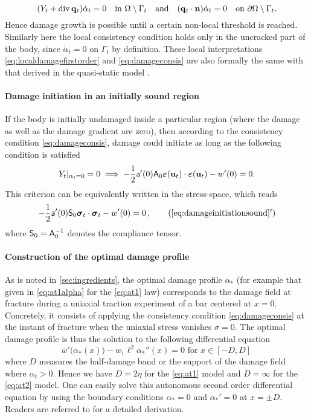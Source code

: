 \begin{equation} \label{eq:damageconsis}
(Y_t+\div\vec{q}_t)\dot{\alpha}_t=0\quad\text{in }\domaint\quad\text{and}\quad(\vec{q}_t\cdot\vec{n})\dot{\alpha}_t=0\quad\text{on }\partial\Omega\setminus\Gamma_t.
\end{equation}
Hence damage growth is possible until a certain non-local threshold is reached. Similarly here the local consistency condition holds only in the uncracked part of the body, since $\dot{\alpha}_t=0$ on $\Gamma_t$ by definition. These local interpretations \eqref{eq:localdamagefirstorder} and \eqref{eq:damageconsis} are also formally the same with that derived in the quasi-static model \cite{PhamMarigo:2010-1,SicsicMarigo:2013}.

\paragraph{Damage initiation in an initially sound region}
If the body is initially undamaged inside a particular region (where the damage as well as the damage gradient are zero), then according to the consistency condition \eqref{eq:damageconsis}, damage could initiate as long as the following condition is satisfied
\begin{equation} \label{eq:damageinitiationsound}
Y_t|_{\alpha_t=0}=0\implies -\frac{1}{2}\mathsf{a}'(0)\tens{A}_0\eps(\vec{u}_t)\cdot\eps(\vec{u}_t)-w'(0)=0.
\end{equation}
This criterion can be equivalently written in the stress-space, which reads
\begin{align} \label{eq:damageinitiationsound2}
-\frac{1}{2}\mathsf{a}'(0)\tens{S}_0\sig_t\cdot\sig_t-w'(0)=0\,, \tag{\ref*{eq:damageinitiationsound}${}^\prime$}
\end{align}
where $\mathsf{S}_0=\mathsf{A}_0^{-1}$ denotes the compliance tensor.

\paragraph{Construction of the optimal damage profile}
As is noted in \cref{sec:ingredients}, the optimal damage profile $\alpha_*$ (for example that given in \eqref{eq:at1alpha} for the \eqref{eq:at1} law) corresponds to the damage field at fracture during a uniaxial traction experiment of a bar centered at $x=0$. Concretely, it consists of applying the consistency condition \eqref{eq:damageconsis} at the instant of fracture when the uniaxial stress vanishes $\sigma=0$. The optimal damage profile is thus the solution to the following differential equation
\begin{equation} \label{eq:defoptimaldamage}
w'\bigl(\alpha_*(x)\bigr)-w_1\ell^2\alpha_*''(x)=0\text{ for $x\in[-D,D]$}\,
\end{equation}
where $D$ measures the half-damage band or the support of the damage field where $\alpha_t> 0$. Hence we have $D=2\eta$ for the \eqref{eq:at1} model and $D=\infty$ for the \eqref{eq:at2} model. One can easily solve this autonomous second order differential equation by using the boundary conditions $\alpha_*=0$ and $\alpha_*'=0$ at $x=\pm D$. Readers are referred to \cite{PhamAmorMarigoMaurini:2011} for a detailed derivation.

